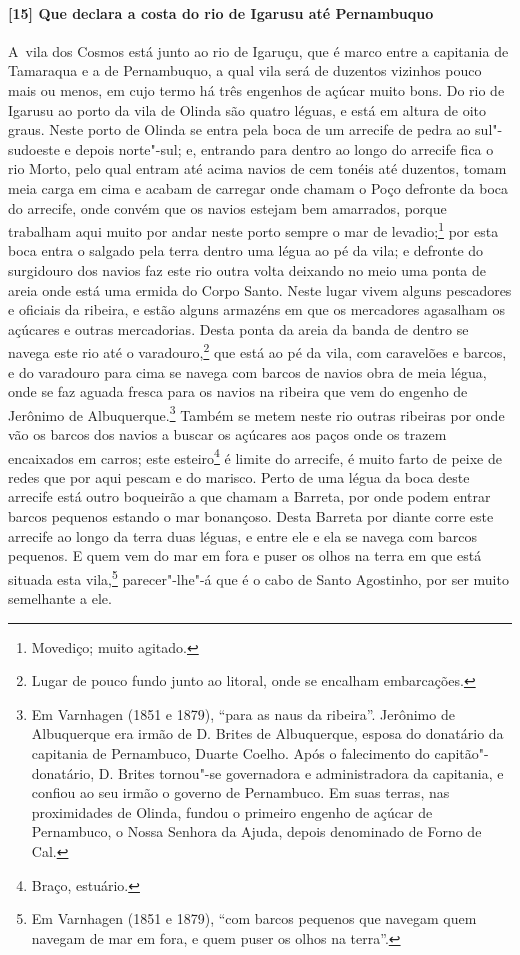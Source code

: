 \begin{linenumbers}
\paragraph{[15] Que declara a costa do rio de Igarusu até Pernambuquo} \quad
\mbox{A vila} dos Cosmos está junto ao rio de Igaruçu, que é marco entre a capitania de Tamaraqua
e a de Pernambuquo, a qual vila será de duzentos vizinhos pouco mais ou menos, em cujo
termo há três engenhos de açúcar muito bons. Do rio de Igarusu ao porto da vila de Olinda
são quatro léguas, e está em altura de oito graus. Neste porto de Olinda se entra pela
boca de um arrecife de pedra ao sul"-sudoeste e depois norte"-sul; e, entrando para dentro
ao longo do arrecife fica o rio Morto, pelo qual entram até acima navios de cem tonéis até
duzentos, tomam meia carga em cima e acabam de carregar onde chamam o Poço defronte da
boca do arrecife, onde convém que os navios estejam bem amarrados, porque trabalham aqui
muito por andar neste porto sempre o mar de levadio;\footnote{ Movediço; muito agitado.}
por esta boca entra o salgado pela terra dentro uma légua ao pé da vila; e defronte do
surgidouro dos navios faz este rio outra volta deixando no meio uma ponta de areia onde
está uma ermida do Corpo Santo. Neste lugar vivem alguns pescadores e oficiais da ribeira,
e estão alguns armazéns em que os mercadores agasalham os açúcares e outras mercadorias.
Desta ponta da areia da banda de dentro se navega este rio até o varadouro,\footnote{ Lugar
de pouco fundo junto ao litoral, onde se encalham embarcações.} que está ao pé da vila,
com caravelões e barcos, e do varadouro para cima se navega com barcos de navios obra de
meia légua, onde se faz aguada fresca para os navios na ribeira que vem do engenho de
Jerônimo de Albuquerque.\footnote{ Em Varnhagen (1851 e 1879), ``para as naus da
ribeira''. Jerônimo de Albuquerque era irmão de D. Brites de Albuquerque, esposa do
donatário da capitania de Pernambuco, Duarte Coelho. Após o falecimento do
capitão"-donatário, D. Brites tornou"-se governadora e administradora da capitania, e
confiou ao seu irmão o governo de Pernambuco. Em suas terras, nas proximidades de Olinda,
fundou o primeiro engenho de açúcar de Pernambuco, o Nossa Senhora da Ajuda, depois
denominado de Forno de Cal.} Também se metem neste rio outras ribeiras por onde vão os
barcos dos navios a buscar os açúcares aos paços onde os trazem encaixados em carros; este
esteiro\footnote{ Braço, estuário.} é limite do arrecife, é muito farto de peixe de redes
que por aqui pescam e do marisco. Perto de uma légua da boca deste arrecife está outro
boqueirão a que chamam a Barreta, por onde podem entrar barcos pequenos estando o mar
bonançoso. Desta Barreta por diante corre este arrecife ao longo da terra duas léguas, e
entre ele e ela se navega com barcos pequenos. E quem vem do mar em fora e puser os olhos
na terra em que está situada esta vila,\footnote{ Em Varnhagen (1851 e 1879), ``com barcos
pequenos que navegam quem navegam de mar em fora, e quem puser os olhos na terra''.}
parecer"-lhe"-á que é o cabo de Santo Agostinho, por ser muito semelhante a ele.


\end{linenumbers}
